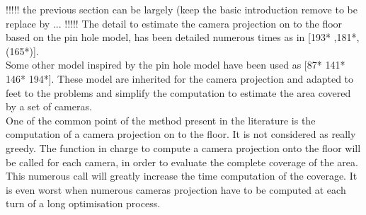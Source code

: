 !!!!! the previous section can be largely (keep the basic introduction remove to be replace by ... !!!!!
\fi
The detail to estimate the camera projection on to the floor based on the pin hole model, has been detailed numerous times as in  [193* ,181*, (165*)]. \\
Some other model inspired by the pin hole model have been used  as [87* 141* 146* 194*]. These model are inherited  for the camera projection and adapted to feet to the problems and simplify the computation to estimate the area covered by a set of cameras. \\
One of the common point of the method present in the literature is the computation of a camera projection on to the floor. It is not considered as really greedy. The function in charge to compute a camera projection onto the floor will be called for each camera,  in order to evaluate the complete coverage of the area. This numerous call will greatly increase the time computation of the coverage.  It is even worst when numerous cameras projection have to be computed at each turn of a long optimisation process.\\

